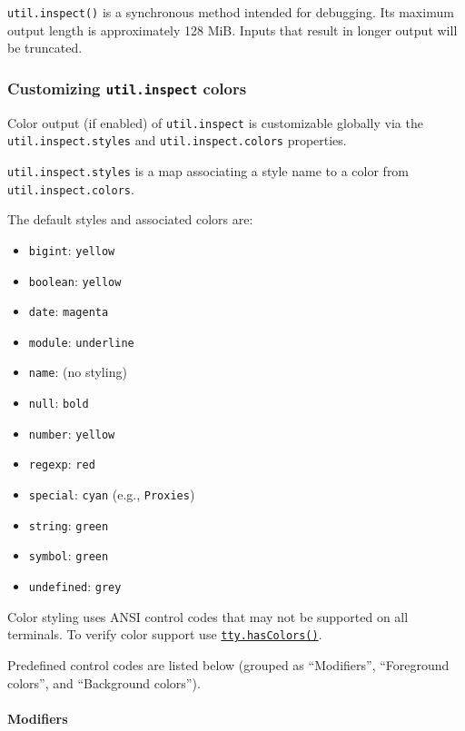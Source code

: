 \texttt{util.inspect()} is a synchronous method intended for debugging.
Its maximum output length is approximately 128 MiB. Inputs that result
in longer output will be truncated.

\subsubsection{\texorpdfstring{Customizing \texttt{util.inspect}
colors}{Customizing util.inspect colors}}\label{customizing-util.inspect-colors}

Color output (if enabled) of \texttt{util.inspect} is customizable
globally via the \texttt{util.inspect.styles} and
\texttt{util.inspect.colors} properties.

\texttt{util.inspect.styles} is a map associating a style name to a
color from \texttt{util.inspect.colors}.

The default styles and associated colors are:

\begin{itemize}
\tightlist
\item
  \texttt{bigint}: \texttt{yellow}
\item
  \texttt{boolean}: \texttt{yellow}
\item
  \texttt{date}: \texttt{magenta}
\item
  \texttt{module}: \texttt{underline}
\item
  \texttt{name}: (no styling)
\item
  \texttt{null}: \texttt{bold}
\item
  \texttt{number}: \texttt{yellow}
\item
  \texttt{regexp}: \texttt{red}
\item
  \texttt{special}: \texttt{cyan} (e.g., \texttt{Proxies})
\item
  \texttt{string}: \texttt{green}
\item
  \texttt{symbol}: \texttt{green}
\item
  \texttt{undefined}: \texttt{grey}
\end{itemize}

Color styling uses ANSI control codes that may not be supported on all
terminals. To verify color support use
\href{tty.md\#writestreamhascolorscount-env}{\texttt{tty.hasColors()}}.

Predefined control codes are listed below (grouped as ``Modifiers'',
``Foreground colors'', and ``Background colors'').

\paragraph{Modifiers}\label{modifiers}


